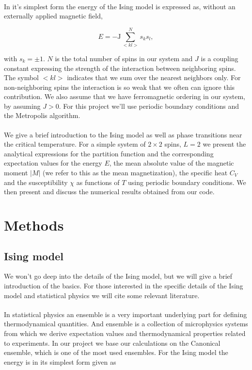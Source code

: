 \documentclass[a4paper, fontsize=11pt]{article}
\begin{document}
\paragraph{}
In it's simplest form the energy of the Ising model is expressed as, without an externally applied magnetic field,

\begin{equation}
E = -\text{J} \sum^N_{<kl>} s_{k} s_{l},
\end{equation}

with $s_{k}=\pm 1$. $N$ is the total number of spins in our system and $J$ is a coupling constant expressing the strength of the interaction between neighboring spins. The symbol $<kl>$ indicates that we sum over the nearest neighbors only. For non-neighboring spins the interaction is so weak that we often can ignore this contribution. We also assume that we have ferromagnetic ordering in our system, by assuming $J> 0$. For this project we'll use periodic boundary conditions and the Metropolis algorithm.


\paragraph{}
We give a brief introduction to the Ising model as well as phase transitions near the critical temperature. For a simple system of $2 \times 2$ spins, $L = 2$ we present the analytical expressions for the partition function and the corresponding expectation values for the energy $E$, the mean absolute value of the magnetic moment $\lvert M \rvert$ (we refer to this as the mean magnetization), the specific heat $C_{V}$ and the susceptibility $\chi$ as functions of $T$ using periodic boundary conditions. We then present and discuss the numerical results obtained from our code.



\section{Methods}


\subsection{Ising model}
We won't go deep into the details of the Ising model, but we will give a brief introduction of the basics. For those interested in the specific details of the Ising model and statistical physics we will cite some relevant literature.


\paragraph{}
In statistical physics an ensemble is a very important underlying part for defining thermodynamical quantities. And ensemble is a collection of microphysics systems from which we derive expectation values and thermodynamical properties related to experiments. In our project we base our calculations on the Canonical ensemble, which is one of the most used ensembles. For the Ising model the energy is in its simplest form given as 
\end{document}
